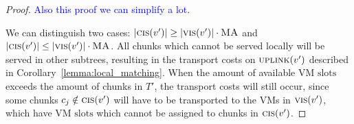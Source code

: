 \documentclass[9pt,twocolumn]{scrartcl}
\newcommand{\VmSlot}{\text{VM slot}}
\newcommand{\VmSlots}{\VmSlot\text{s}}
\newcommand{\stefan}[1]{\textcolor{blue}{#1}}
\newcommand{\MaFactor}{\ensuremath{\textsc{MA}}}
\newcommand{\SubstrateNode}{\ensuremath{v}}
\newcommand{\Uplink}{\ensuremath{\textsc{uplink}}}
\newcommand{\ChunkCount}{\ensuremath{\textsc{cis}}}
\newcommand{\VmCount}{\ensuremath{\textsc{vis}}}
\newcommand{\achunk}{\ensuremath{c}}
\newcommand{\Tree}{\ensuremath{T}}
\begin{document}
\begin{proof}
\stefan{Also this proof we can simplify a lot.}


We can distinguish two cases: 
$|\ChunkCount(\SubstrateNode')| \geq
|\VmCount(\SubstrateNode')| \cdot \MaFactor$ and
$|\ChunkCount(\SubstrateNode')| \leq
|\VmCount(\SubstrateNode')| \cdot \MaFactor$. 
All chunks which cannot be served locally will be served in
other subtrees, resulting in the transport costs on $\Uplink(\SubstrateNode')$
described in Corollary~\ref{lemma:local_matching}. When the amount of
available $\VmSlots$
exceeds the amount of chunks in $\Tree'$, the transport costs will still occur,
since some chunks $\achunk_j \notin \ChunkCount(\SubstrateNode')$ will have to
be transported to the VMs in $\VmCount(\SubstrateNode')$, which have $\VmSlots$
which cannot be
assigned to chunks in $\ChunkCount(\SubstrateNode')$.


\end{proof}
\end{document}
